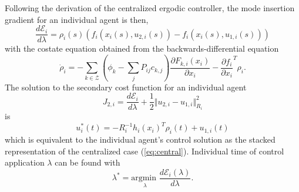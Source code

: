 \documentclass[letterpaper, 10 pt,  conference, twoside]{IEEEtran/IEEEtran}
\theoremstyle{definition}
\begin{document}
Following the derivation of the centralized ergodic controller, the mode insertion gradient for an individual agent is then,
\begin{equation*}
\frac{d \mathcal{E}_i}{d \lambda} = \rho_i(s) (f_i(x_i(s), u_{2,i}(s)) - f_i(x_i(s), u_{1,i}(s)))
\end{equation*}
with the costate equation obtained from the backwards-differential equation
\begin{equation*}
\dot{\rho}_i = - \sum_{k \in \mathcal{Z}}(\phi_k - \sum_j P _{ij} c_{k,j}) \frac{\partial F_{k,i}(x_i)}{\partial x_i} - \frac{\partial f_i}{\partial x_i }^T \rho_i.
\end{equation*}
The solution to the secondary cost function for an individual agent
\begin{equation*}
J_{2,i} = \frac{d \mathcal{E}_i}{d \lambda} + \frac{1}{2} \Vert u_{2,i} - u_{1,i}\Vert ^2_{R_i}
\end{equation*}
is
\begin{equation}
u^*_i(t) = -R_i^{-1} h_i(x_i)^T \rho_i(t) + u_{1,i}(t)
\end{equation}
which is equivalent to the individual agent's control solution as the stacked representation of the centralized case (\ref{eq:central}). Individual time of control application $\lambda$ can be found with
\begin{equation*}
\lambda ^*= \underset{\lambda}{\text{argmin }} \frac{d\mathcal{E}_i (\lambda)}{d\lambda} .
\end{equation*}
\end{document}
